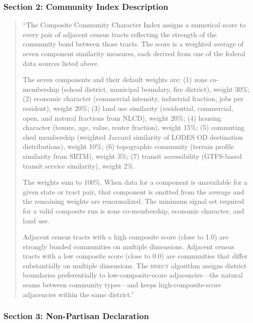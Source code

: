 \subsubsection*{Section 2: Community Index Description}

\begin{quote}
``The Composite Community Character Index assigns a numerical score to every
pair of adjacent census tracts reflecting the strength of the community bond
between those tracts.
The score is a weighted average of seven component similarity measures,
each derived from one of the federal data sources listed above.

The seven components and their default weights are:
(1) zone co-membership (school district, municipal boundary, fire district),
weight 30\%; (2) economic character (commercial intensity, industrial fraction,
jobs per resident), weight 20\%; (3) land use similarity (residential,
commercial, open, and natural fractions from NLCD), weight 20\%;
(4) housing character (tenure, age, value, renter fraction), weight 15\%;
(5) commuting shed membership (weighted Jaccard similarity of LODES OD
destination distributions), weight 10\%;
(6) topographic community (terrain profile similarity from SRTM), weight 3\%;
(7) transit accessibility (GTFS-based transit service similarity), weight 2\%.

The weights sum to 100\%.
When data for a component is unavailable for a given state or tract pair,
that component is omitted from the average and the remaining weights are
renormalized.
The minimum signal set required for a valid composite run is zone
co-membership, economic character, and land use.

Adjacent census tracts with a high composite score (close to 1.0) are
strongly bonded communities on multiple dimensions.
Adjacent census tracts with a low composite score (close to 0.0) are
communities that differ substantially on multiple dimensions.
The \textsc{bisect} algorithm assigns district boundaries preferentially
to low-composite-score adjacencies---the natural seams between community
types---and keeps high-composite-score adjacencies within the same district.''
\end{quote}

\subsubsection*{Section 3: Non-Partisan Declaration}

